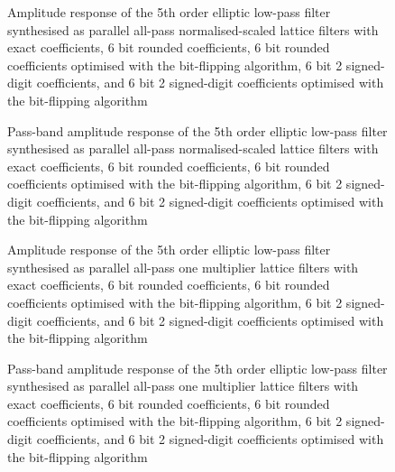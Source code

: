 \documentclass[a4paper,twoside,10pt,english]{report}
\begin{document}
\begin{figure}[!htbp]
\begin{center}
\scalebox{0.7}{}
\caption{Amplitude response of the 5th order elliptic low-pass filter
synthesised as parallel all-pass normalised-scaled lattice filters with
exact coefficients, 6 bit rounded coefficients, 6 bit rounded coefficients 
optimised with the bit-flipping algorithm, 6 bit 2 signed-digit coefficients, 
and 6 bit 2 signed-digit coefficients optimised with the bit-flipping algorithm}
\label{fig:bitflip_NSPA_lattice_response}
\end{center}
\end{figure}

\begin{figure}[!htbp]
\begin{center}
\scalebox{0.7}{}
\caption{Pass-band amplitude response of the 5th order elliptic low-pass
filter synthesised as parallel all-pass normalised-scaled lattice filters with
exact coefficients, 6 bit rounded coefficients, 6 bit rounded coefficients 
optimised with the bit-flipping algorithm, 6 bit 2 signed-digit coefficients, 
and 6 bit 2 signed-digit coefficients optimised with the bit-flipping algorithm}
\label{fig:bitflip_NSPA_lattice_passband_response}
\end{center}
\end{figure}

\begin{figure}[!htbp]
\begin{center}
\scalebox{0.7}{}
\caption{Amplitude response of the 5th order elliptic low-pass
filter synthesised as parallel all-pass one multiplier lattice filters with 
exact coefficients, 6 bit rounded coefficients, 6 bit rounded coefficients 
optimised with the bit-flipping algorithm, 6 bit 2 signed-digit coefficients, 
and 6 bit 2 signed-digit coefficients optimised with the bit-flipping algorithm}
\label{fig:bitflip_OneMPA_lattice_response}
\end{center}
\end{figure}

\begin{figure}[!htbp]
\begin{center}
\scalebox{0.7}{}
\caption{Pass-band amplitude response of the 5th order elliptic low-pass
filter synthesised as parallel all-pass one multiplier lattice filters with
exact coefficients, 6 bit rounded coefficients, 6 bit rounded coefficients 
optimised with the bit-flipping algorithm, 6 bit 2 signed-digit coefficients, 
and 6 bit 2 signed-digit coefficients optimised with the bit-flipping algorithm}
\label{fig:bitflip_OneMPA_lattice_passband_response}
\end{center}
\end{figure}
\end{document}
